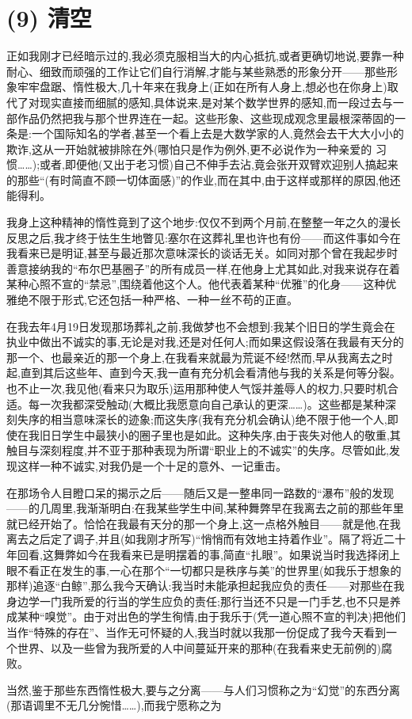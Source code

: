 \section{(9) 清空}

正如我刚才已经暗示过的,我必须克服相当大的内心抵抗,或者更确切地说,要靠一种耐心、细致而顽强的工作让它们自行消解,才能与某些熟悉的形象分开——那些形象牢牢盘踞、惰性极大,几十年来在我身上(正如在所有人身上,想必也在你身上)取代了对现实直接而细腻的感知,具体说来,是对某个数学世界的感知,而一段过去与一部作品仍然把我与那个世界连在一起。这些形象、这些现成观念里最根深蒂固的一条是:一个国际知名的学者,甚至一个看上去是大数学家的人,竟然会去干大大小小的欺诈,这从一开始就被排除在外(哪怕只是作为例外,更不必说作为一种亲爱的
习惯……);或者,即便他(又出于老习惯)自己不伸手去沾,竟会张开双臂欢迎别人搞起来的那些“(有时简直不顾一切体面感)”的作业,而在其中,由于这样或那样的原因,他还能得利。

我身上这种精神的惰性竟到了这个地步:仅仅不到两个月前,在整整一年之久的漫长反思之后,我才终于怯生生地瞥见:塞尔在这葬礼里也许也有份——而这件事如今在我看来已是明证,甚至与最近那次意味深长的谈话无关。如同对那个曾在我起步时善意接纳我的“布尔巴基圈子”的所有成员一样,在他身上尤其如此,对我来说存在着某种心照不宣的“禁忌”,围绕着他这个人。他代表着某种“优雅”的化身——这种优雅绝不限于形式,它还包括一种严格、一种一丝不苟的正直。

在我去年4月19日发现那场葬礼之前,我做梦也不会想到:我某个旧日的学生竟会在执业中做出不诚实的事,无论是对我,还是对任何人;而如果这假设落在我最有天分的那一个、也最亲近的那一个身上,在我看来就最为荒诞不经!然而,早从我离去之时起,直到其后这些年、直到今天,我一直有充分机会看清他与我的关系是何等分裂。也不止一次,我见他(看来只为取乐)运用那种使人气馁并羞辱人的权力,只要时机合适。每一次我都深受触动(大概比我愿意向自己承认的更深……)。这些都是某种深刻失序的相当意味深长的迹象;而这失序(我有充分机会确认)绝不限于他一个人,即使在我旧日学生中最狭小的圈子里也是如此。这种失序,由于丧失对他人的敬重,其触目与深刻程度,并不亚于那种表现为所谓“职业上的不诚实”的失序。尽管如此,\dmark 发现这样一种不诚实,对我仍是一个十足的意外、一记重击。

在那场令人目瞪口呆的揭示之后——随后又是一整串同一路数的“瀑布”般的发现——的几周里,我渐渐明白:在我某些学生中间,某种舞弊早在我离去之前的那些年里就已经开始了。恰恰在我最有天分的那一个身上,这一点格外触目——就是他,在我离去之后定了调子,并且(如我刚才所写)“悄悄而有效地主持着作业”。隔了将近二十年回看,这舞弊如今在我看来已是明摆着的事,简直“扎眼”。如果说当时我选择闭上眼不看正在发生的事,一心在那个“一切都只是秩序与美”的世界里(如我乐于想象的那样)追逐“白鲸”,那么我今天确认:我当时未能承担起我应负的责任——对那些在我身边学一门我所爱的行当的学生应负的责任;那行当还不只是一门手艺,也不只是养成某种“嗅觉”。由于对出色的学生徇情,由于我乐于(凭一道心照不宣的判决)把他们当作“特殊的存在”、当作无可怀疑的人,我当时就以我那一份促成了我今天看到一个世界、以及一些曾为我所爱的人中间蔓延开来的那种(在我看来史无前例的)腐败。

当然,鉴于那些东西惰性极大,要与之分离——与人们习惯称之为“幻觉”的东西分离(那语调里不无几分惋惜……),而我宁愿称之为

